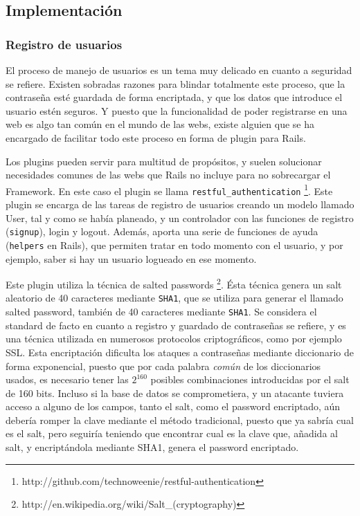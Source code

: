 
\subsection{Implementación} %
\label{sub:implementación}

\subsubsection{Registro de usuarios} %
\label{ssub:registro_de_usuarios}

El proceso de manejo de usuarios es un tema muy delicado en cuanto a seguridad se refiere. Existen sobradas razones para blindar totalmente este proceso, que la contraseña esté guardada de forma encriptada, y que los datos que introduce el usuario estén seguros. Y puesto que la funcionalidad de poder registrarse en una web es algo tan común en el mundo de las webs, existe alguien que se ha encargado de facilitar todo este proceso en forma de plugin para Rails.

Los plugins pueden servir para multitud de propósitos, y suelen solucionar necesidades comunes de las webs que Rails no incluye para no sobrecargar el Framework. En este caso el plugin se llama \texttt{restful\_authentication} \footnote{http://github.com/technoweenie/restful-authentication}. Este plugin se encarga de las tareas de registro de usuarios creando un modelo llamado User, tal y como se había planeado, y un controlador con las funciones de registro (\texttt{signup}), login y logout. Además, aporta una serie de funciones de ayuda (\texttt{helpers} en Rails), que permiten tratar en todo momento con el usuario, y por ejemplo, saber si hay un usuario logueado en ese momento. 

Este plugin utiliza la técnica de salted passwords \footnote{http://en.wikipedia.org/wiki/Salt\_(cryptography)}. Ésta técnica genera un salt aleatorio de 40 caracteres mediante \texttt{SHA1}, que se utiliza para generar el llamado salted password, también de 40 caracteres mediante \texttt{SHA1}. Se considera el standard de facto en cuanto a registro y guardado de contraseñas se refiere, y es una técnica utilizada en numerosos protocolos criptográficos, como por ejemplo SSL. Esta encriptación dificulta los ataques a contraseñas mediante diccionario de forma exponencial, puesto que por cada palabra \emph{común} de los diccionarios usados, es necesario tener las $2^{160}$ posibles combinaciones introducidas por el salt de 160 bits. Incluso si la base de datos se comprometiera, y un atacante tuviera acceso a alguno de los campos, tanto el salt, como el password encriptado, aún debería romper la clave mediante el método tradicional, puesto que ya sabría cual es el salt, pero seguiría teniendo que encontrar cual es la clave que, añadida al salt, y encriptándola mediante SHA1, genera el password encriptado.


